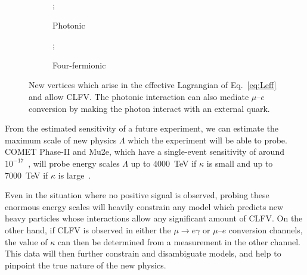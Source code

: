 \begin{figure}
    \centering
    \begin{subfigure}[b]{0.3\textwidth}
        \centering
        ;
        \caption{Photonic}
    \end{subfigure}
    \hspace{1cm}
    \begin{subfigure}[b]{0.3\textwidth}
        \centering
        ;
        \caption{Four-fermionic}
    \end{subfigure}
    \caption{New vertices which arise in the effective Lagrangian of
    Eq.~\ref{eq:Leff} and allow CLFV. The photonic interaction can also mediate
    $\mu$--$e$ conversion by making the photon interact with an external quark.}
    \label{fig:tree_lvl_clfv}
\end{figure}

From the estimated sensitivity of a future experiment, we can estimate the
maximum scale of new physics $\Lambda$ which the experiment will be able to
probe. COMET Phase-II and Mu2e, which have a single-event sensitivity of around
$10^{-17}$~\cite{the_comet_collaboration_comet_2020, bartoszek2015mu2e}, will
probe energy scales $\Lambda$ up to \SI{4000}{\tera\eV} if $\kappa$ is small and up to
\SI{7000}{\tera\eV} if $\kappa$ is large~\cite{ben_thesis, ewen_thesis}. 

Even in the situation where no positive signal is observed, probing these enormous
energy scales will heavily constrain any model which predicts new heavy
particles whose interactions allow any significant amount of CLFV. On the other
hand, if CLFV is observed in either the $\mu\rightarrow e\gamma$ or $\mu$--$e$
conversion channels, the value of $\kappa$ can then be determined from a
measurement in the other channel. This data will then further constrain and
disambiguate models, and help to pinpoint the true nature of the new physics.
